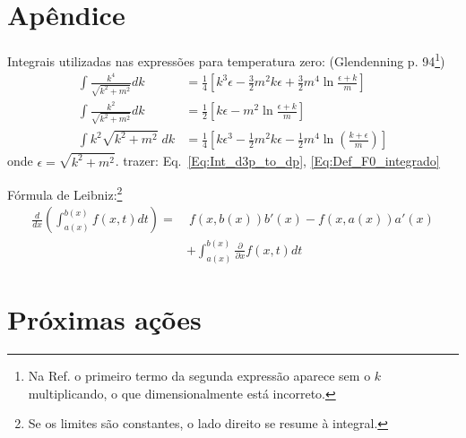 
\section{Apêndice}

Integrais utilizadas nas expressões para temperatura zero: (Glendenning\cite{Glendenning} p. 94\footnote{Na Ref. o primeiro termo da segunda expressão aparece sem o $k$ multiplicando, o que dimensionalmente está incorreto.})
\begin{align}
	\int \frac{k^4}{\sqrt{k^2 + m^2}} dk &= \frac{1}{4}\left[k^3\epsilon - \frac{3}{2} m^2k\epsilon + \frac{3}{2}m^4\ln\frac{\epsilon + k}{m} \right] \label{Eq:Integ_momento_quarta}\\
	\int \frac{k^2}{\sqrt{k^2 + m^2}} dk &= \frac{1}{2}\left[k\epsilon - m^2\ln\frac{\epsilon + k}{m}\right] \label{Eq:Integ_momento_quad} \\
	\int k^2 \sqrt{k^2 + m^2} \;dk &= \frac{1}{4}\left[k \epsilon^3 - \frac{1}{2} m^2 k \epsilon - \frac{1}{2} m^4\ln\left(\frac{k+\epsilon}{m}\right)\right] \label{Eq:Def_F_E}
\end{align}
%
onde $\epsilon = \sqrt{k^2+m^2}$. 
trazer: Eq.~\ref{Eq:Int_d3p_to_dp}, \eqref{Eq:Def_F0_integrado}

Fórmula de Leibniz:\footnote{Se os limites são constantes, o lado direito se resume à integral.}
\begin{equation}\label{Eq:Form_Leibniz}
\begin{split}
	\frac{d}{dx} \left(\int_{a(x)}^{b(x)} f(x,t) dt\right) =&~ f(x, b(x))b'(x) - f(x, a(x))a'(x) \\
	&+ \int_{a(x)}^{b(x)}\frac{\partial}{\partial x}f(x,t) dt
\end{split}
\end{equation}

\section{Próximas ações}

